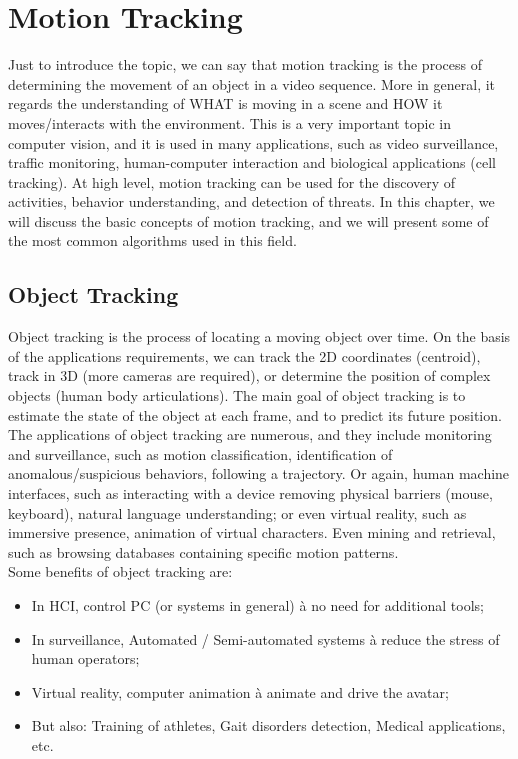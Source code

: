 \chapter{Motion Tracking}
Just to introduce the topic, we can say that motion tracking is the process of determining the movement of an object in a video sequence. 
More in general, it regards the understanding of WHAT is moving in a scene and HOW it moves/interacts with the environment.
This is a very important topic in computer vision, and it is used in many applications, such as video surveillance, traffic monitoring, human-computer interaction and biological applications (cell tracking). 
At high level, motion tracking can be used for the discovery of activities, behavior understanding, and detection of threats.
In this chapter, we will discuss the basic concepts of motion tracking, and we will present some of the most common algorithms used in this field.

\section{Object Tracking}
Object tracking is the process of locating a moving object over time. On the basis of the applications requirements, we can track the 2D coordinates (centroid), track in 3D (more cameras are required), or determine the position of complex objects (human body articulations).
The main goal of object tracking is to estimate the state of the object at each frame, and to predict its future position.
The applications of object tracking are numerous, and they include monitoring and surveillance, such as motion classification, identification of anomalous/suspicious behaviors, following a trajectory. 
Or again, human machine interfaces, such as interacting with a device removing physical barriers (mouse, keyboard), natural language understanding; or even virtual reality, such as immersive presence, animation of virtual characters.
Even mining and retrieval, such as browsing databases containing specific motion patterns.
\\
Some benefits of object tracking are:
\begin{itemize}
\item In HCI, control PC (or systems in general) à no need for additional tools;
\item In surveillance, Automated / Semi-automated systems à reduce the stress of human operators;
\item Virtual reality, computer animation à animate and drive the avatar;
\item But also: Training of athletes, Gait disorders detection, Medical applications, etc.
\end{itemize}

